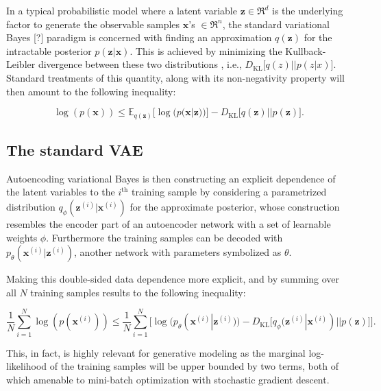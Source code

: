 \documentclass{article}
\begin{document}
In a typical probabilistic model where a latent variable $\mathbf{z} \in \Re^d$ is the underlying factor to generate the observable samples $\mathbf{x}$'s $\in \Re^n$, the standard variational Bayes [?] paradigm is concerned with finding an approximation $q(\mathbf{z})$ for the intractable posterior $p(\mathbf{z}|\mathbf{x})$. This is achieved by minimizing the Kullback-Leibler divergence between these two distributions , i.e., $D_{\text{KL}}\Big[ q(z) || p(z|x) \Big]$. Standard treatments of this quantity, along with its non-negativity property will then amount to the following inequality:

\begin{equation}  \label{eq:VB_ELBO}
\log(p(\mathbf{x})) \leqslant \mathbb{E}_{q(\mathbf{z})} \Big[ \log(p(\mathbf{x}|\mathbf{z}))  \Big] - D_{\text{KL}}\Big[ q(\mathbf{z}) || p(\mathbf{z}) \Big].
\end{equation}

\subsection{The standard VAE} \label{subsec:Vanilla_VAE}

Autoencoding variational Bayes \cite{VAE} is then constructing an explicit dependence of the latent variables to the $i^{\text{th}}$ training sample by considering a parametrized distribution $q_{\phi}(\mathbf{z}^{(i)}|\mathbf{x}^{(i)})$ for the approximate posterior, whose construction resembles the encoder part of an autoencoder network with a set of learnable weights $\phi$. Furthermore the training samples can be decoded with $p_{\theta}(\mathbf{x}^{(i)} | \mathbf{z}^{(i)})$, another network with parameters symbolized as $\theta$.

Making this double-sided data dependence more explicit, and by summing over all $N$ training samples results to the following inequality:


\begin{equation} \label{eq:vae_ELBO}
\frac{1}{N}\sum_{i=1}^N \log(p(\mathbf{x}^{(i)})) \leqslant \frac{1}{N} \sum_{i=1}^N \Big[ \log(p_{\theta}(\mathbf{x}^{(i)}|\mathbf{z}^{(i)}))   -  D_{\text{KL}}\big[ q_{\phi}(\mathbf{z}^{(i)}  | \mathbf{x}^{(i)}) || p(\mathbf{z}) \big] \Big].
\end{equation}

This, in fact, is highly relevant for generative modeling as the marginal log-likelihood of the training samples will be upper bounded by two terms, both of which amenable to mini-batch optimization with stochastic gradient descent. 
\end{document}
